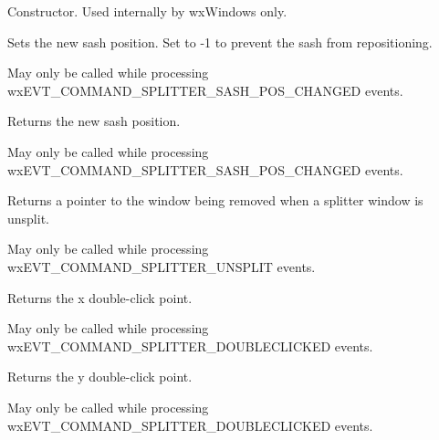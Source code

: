 Constructor. Used internally by wxWindows only.


\label{wxsplittereventsetsashposition}


Sets the new sash position. Set to -1 to prevent the sash from
repositioning.

May only be called while processing
wxEVT\_COMMAND\_SPLITTER\_SASH\_POS\_CHANGED events.




\label{wxsplittereventgetsashposition}


Returns the new sash position.

May only be called while processing
wxEVT\_COMMAND\_SPLITTER\_SASH\_POS\_CHANGED events.


\label{wxsplittereventgetwindowbeingremoved}


Returns a pointer to the window being removed when a splitter window
is unsplit.

May only be called while processing
wxEVT\_COMMAND\_SPLITTER\_UNSPLIT events.


\label{wxsplittereventgetx}


Returns the x double-click point.

May only be called while processing
wxEVT\_COMMAND\_SPLITTER\_DOUBLECLICKED events.


\label{wxsplittereventgety}


Returns the y double-click point.

May only be called while processing
wxEVT\_COMMAND\_SPLITTER\_DOUBLECLICKED events.




